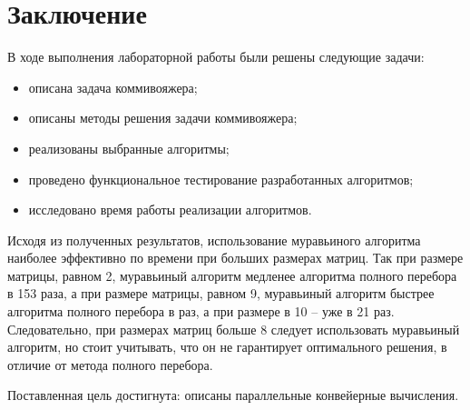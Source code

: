 \chapter*{Заключение}

В ходе выполнения лабораторной работы были решены следующие задачи:

\begin{itemize}
	\item описана задача коммивояжера;
	
	\item описаны методы решения задачи коммивояжера;
	\item реализованы выбранные алгоритмы;
	\item проведено функциональное тестирование разработанных алгоритмов;
	\item исследовано время работы реализации алгоритмов. 
\end{itemize}

Исходя из полученных результатов, использование муравьиного алгоритма наиболее эффективно по времени при больших размерах матриц. Так при размере матрицы, равном 2, муравьиный алгоритм медленее алгоритма полного перебора в 153 раза, а при размере матрицы, равном 9, муравьиный алгоритм быстрее алгоритма полного перебора в раз, а при размере в 10 -- уже в 21 раз. Следовательно, при размерах матриц больше 8 следует использовать муравьиный алгоритм, но стоит учитывать, что он не гарантирует оптимального решения, в отличие от метода полного перебора.

Поставленная цель достигнута: описаны параллельные конвейерные вычисления.